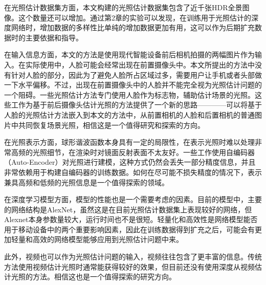 在光照估计数据集方面，本文构建的光照估计数据集包含了近千张HDR全景图像。这个数量还可以增加。通过第2章的实验可以发现，在训练用于光照估计的深度网络时，增加数据的多样性比单纯的增加数据更加有用，这可以作为后期扩充数据时的主要依据和指导。

在输入信息方面，本文的方法是使用现代智能设备前后相机拍摄的两幅图片作为输入。在实际使用中，人脸可能会经常出现在前置摄像头中。本文所提出的方法中没有针对人脸的部分，因此为了避免人脸所占区域过多，需要用户让手机或者头部做一下水平偏移。不过，出现在前置摄像头中的人脸并不能完全视为光照估计问题的一个阻碍。一些光照估计方法专门使用人脸作为标志物，辅助估计场景的光照。这些工作为基于前后摄像头估计光照的方法提供了一个新的思路————可以将基于人脸的光照估计方法嵌入到本文的方法中，从前置相机的人脸和后置相机的普通图片中共同恢复场景光照，相信这是一个值得研究和探索的方向。

在光照表示方面，球形谐波函数本身具有一定的局限性，在表示光照时难以处理非常高频的光照细节，在渲染时对镜面反射表面不太友好。一些工作使用自编码器（Auto-Encoder）对光照进行建模，这种方式仍然会丢失一部分精度信息，并且非常依赖用于构建自编码器的训练数据。如何在尽可能不损失精度的情况下，表示兼具高频和低频的光照信息是一个值得探索的领域。

在深度学习模型方面，模型的性能也是一个需要考虑的因素。目前的模型中，主要的网络结构是AlexNet，虽然这是在目前光照估计数据集上表现较好的网络，但Alexnet本身参数量较大，运行时间也不是很短。轻量化和高效性是网络模型能否用于移动设备中的两个重要影响因素，因此在训练数据得到扩充之后，可能会有更加轻量和高效的网络模型能够应用到光照估计问题中来。

此外，视频也可以作为光照估计问题的输入，视频往往包含了更丰富的信息。传统方法使用视频估计光照时通常能获得较好的效果，但目前还没有使用深度从视频估计光照的方法。相信这也是一个值得探索的研究方向。